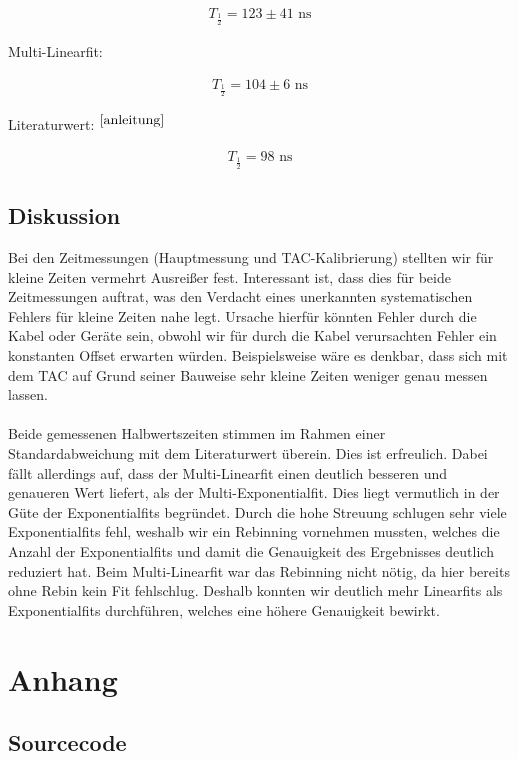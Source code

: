 \documentclass[12pt]{article}
\begin{document}
\begin{align*}
T_{\frac12} = 123 \pm 41 \text{ ns}
\end{align*}

Multi-Linearfit:

\begin{align*}
T_{\frac12} = 104 \pm 6 \text{ ns}
\end{align*}

Literaturwert: $^{\cite{anleitung}}$

\begin{align*}
T_{\frac12} = 98 \text{ ns}
\end{align*}


\subsection{Diskussion}

Bei den Zeitmessungen (Hauptmessung und TAC-Kalibrierung) stellten wir für kleine Zeiten vermehrt Ausreißer fest. Interessant ist, dass dies für beide Zeitmessungen auftrat, was den Verdacht eines unerkannten systematischen Fehlers für kleine Zeiten nahe legt. Ursache hierfür könnten Fehler durch die Kabel oder Geräte sein, obwohl wir für durch die Kabel verursachten Fehler ein konstanten Offset erwarten würden. Beispielsweise wäre es denkbar, dass sich mit dem TAC auf Grund seiner Bauweise sehr kleine Zeiten weniger genau messen lassen.
\\\ \\
Beide gemessenen Halbwertszeiten stimmen im Rahmen einer Standardabweichung mit dem Literaturwert überein. Dies ist erfreulich.
Dabei fällt allerdings auf, dass der Multi-Linearfit einen deutlich besseren und genaueren Wert liefert, als der Multi-Exponentialfit. Dies liegt vermutlich in der Güte der Exponentialfits begründet. Durch die hohe Streuung schlugen sehr viele Exponentialfits fehl, weshalb wir ein Rebinning vornehmen mussten, welches die Anzahl der Exponentialfits und damit die Genauigkeit des Ergebnisses deutlich reduziert hat. Beim Multi-Linearfit war das Rebinning nicht nötig, da hier bereits ohne Rebin kein Fit fehlschlug. Deshalb konnten wir deutlich mehr Linearfits als Exponentialfits durchführen, welches eine höhere Genauigkeit bewirkt.

\newpage
\section{Anhang}

\subsection{Sourcecode}
\end{document}
